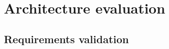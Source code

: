 
\newcommand{\bo}[1]{\textbf{#1}}

\chapter{Architecture evaluation}
\label{ch:evaluation}



\section{Requirements validation}
\label{sec:req-validation}

